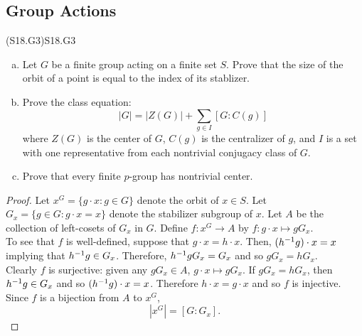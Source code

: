 \documentclass[../AlgebraQualSolutions.tex]{subfiles}
\begin{document}
\subsection{Group Actions}

\begin{prob}{(S18.G3)}{S18.G3}
    \begin{enumerate}[(a)]
        \item Let $G$ be a finite group acting on a finite set $S$. Prove that the size of the orbit of a point is equal to the index  of its stablizer.
        \item Prove  the class equation:
            \[|G| = |Z(G)| + \sum_{g \in I}[G: C(g)]\]
        where $Z(G)$ is the center of $G$, $C(g)$ is the centralizer of $g$, and $I$ is a set with one representative from each nontrivial conjugacy class of $G$.
        \item Prove  that every finite $p$-group has nontrivial center.
    \end{enumerate}
\end{prob}

\begin{proof}
    Let $x^G = \{g\cdot x: g \in G\}$ denote the orbit of $x \in S$. Let $G_x = \{g \in G: g\cdot x = x\}$ denote the stabilizer subgroup of $x$. Let $A$ be the collection of left-cosets of $G_x$ in $G$. Define $f: x^G \to A$ by $f: g\cdot x \mapsto gG_x$.\\

    To see that $f$ is well-defined, suppose that $g\cdot x = h \cdot x$. Then, $(h^{-1} g)\cdot x = x$ implying that $h^{-1} g \in G_x$. Therefore, $h^{-1} g G_x = G_x$ and so $gG_x = hG_x$.\\

    Clearly $f$ is surjective: given any $gG_x \in A$, $g\cdot x \mapsto gG_x$. If $gG_x = hG_x$, then $h^{-1} g \in G_x$ and so $(h^{-1} g) \cdot x = x$. Therefore $h\cdot x = g\cdot x$ and so $f$ is injective.\\

    Since $f$ is a bijection from $A$ to $x^G$,
        \[|x^G| = [G: G_x].\]
\end{proof}
\end{document}
